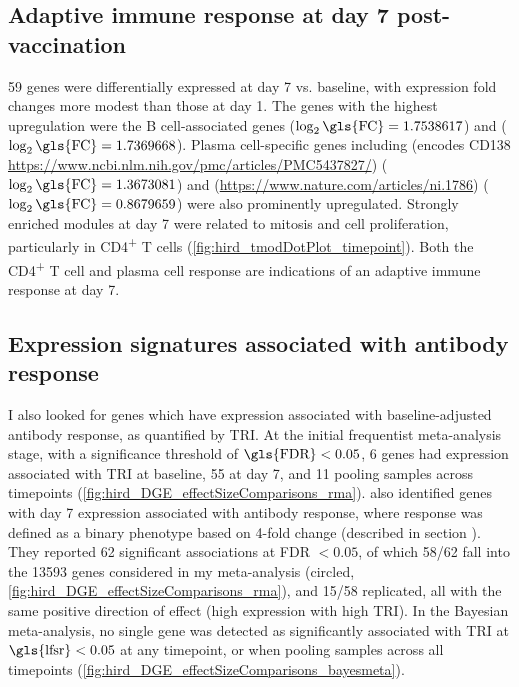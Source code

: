 \subsection{Adaptive immune response at day 7 post-vaccination}

59 genes were differentially expressed at day 7 vs. baseline, with expression fold changes more modest than those at day 1.
The genes with the highest upregulation were the B cell-associated genes  ($\log_2\text{\gls{FC}} = 1.7538617$) and  ($\log_2\text{\gls{FC}} = 1.7369668$).
Plasma cell-specific genes including  (encodes CD138 \url{https://www.ncbi.nlm.nih.gov/pmc/articles/PMC5437827/}) ($\log_2\text{\gls{FC}} = 1.3673081$) and  (\url{https://www.nature.com/articles/ni.1786}) ($\log_2\text{\gls{FC}} = 0.8679659$) were also prominently upregulated.
Strongly enriched modules at day 7 were related to mitosis and cell proliferation, particularly in CD4\textsuperscript{+} T cells (\cref{fig:hird_tmodDotPlot_timepoint}).
Both the CD4\textsuperscript{+} T cell and plasma cell response are indications of an adaptive immune response at day 7.

\subsection{Expression signatures associated with antibody response}

I also looked for genes which have expression associated with baseline-adjusted antibody response, as quantified by \gls{TRI}.
At the initial frequentist meta-analysis stage, with a significance threshold of $\text{\gls{FDR}} < 0.05$, 6 genes had expression associated with \gls{TRI} at baseline, 55 at day 7, and 11 pooling samples across timepoints (\cref{fig:hird_DGE_effectSizeComparisons_rma}).
\autocite{sobolev2016AdjuvantedInfluenzaH1N1Vaccination} also identified genes with day 7 expression associated with antibody response, where response was defined as a binary phenotype based on 4-fold change (described in section ).
They reported 62 significant associations at \gls{FDR} $< 0.05$, of which 58/62 fall into the 13593 genes considered in my meta-analysis (circled, \cref{fig:hird_DGE_effectSizeComparisons_rma}), and 15/58 replicated, all with the same positive direction of effect (high expression with high \gls{TRI}).
In the Bayesian meta-analysis, no single gene was detected as significantly associated with \gls{TRI} at $\text{\gls{lfsr}} < 0.05$ at any timepoint, or when pooling samples across all timepoints (\cref{fig:hird_DGE_effectSizeComparisons_bayesmeta}).


